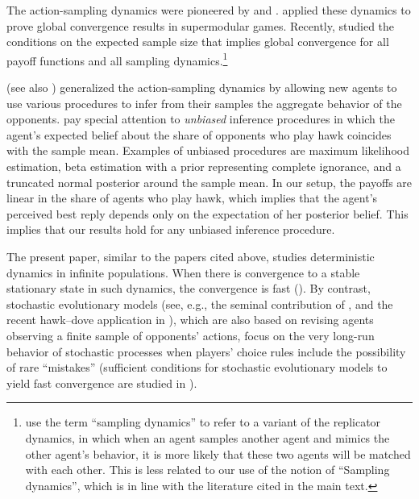 \documentclass[12pt]{article}
\numberwithin{equation}{section}
\numberwithin{figure}{section}
\theoremstyle{definition}
\theoremstyle{plain}
\theoremstyle{plain}
\theoremstyle{plain}
\theoremstyle{remark}
\theoremstyle{plain}
\theoremstyle{plain}
\begin{document}
The action-sampling dynamics were pioneered by 
  \cite{sandholm2001almost} and \cite{osborne2003sampling}. \cite{oyama2015sampling} applied these dynamics to prove global convergence results in supermodular games. Recently, \cite{heller2018social} studied the conditions on the expected sample size 
    that implies global convergence for all payoff functions and all sampling dynamics.\footnote{   \cite{hauert2018effects} use the term ``sampling dynamics'' to refer to a variant  of the replicator dynamics, in which when an agent samples another agent and mimics the other agent's behavior, it is more likely that these two agents will be matched with each other. This is less related to our use of the notion of ``Sampling dynamics'', which is in line with the literature cited in the main text.}

  
  \cite{salant2020statistical} (see also \citealp{sawa2021statistical}) generalized the action-sampling dynamics by allowing new agents to use various procedures to infer from their samples the aggregate behavior of the opponents.  \citeauthor{salant2020statistical} pay special attention to \emph{unbiased} inference procedures in which the agent's expected belief about the share of opponents who play hawk coincides with the sample mean. Examples of unbiased procedures are maximum likelihood estimation, beta estimation with a prior representing complete ignorance, and a truncated normal posterior around the sample mean. In our setup, the payoffs are linear in the share of agents who play hawk, which implies that the agent's perceived best reply depends only on the expectation of her posterior belief. This implies that our results hold for any unbiased inference procedure.
  
  The present paper, similar to the papers cited above, studies deterministic dynamics in infinite populations. When there is convergence to a stable stationary state in such dynamics, the convergence is fast
  (\citealp{oyama2015sampling}).
  By contrast, stochastic evolutionary models (see, e.g., the seminal contribution of \citealp{young1993evolution}, 
  and the recent hawk--dove application in \citealp{Bilancini-et-al-2021}), which are also based on revising agents observing a finite sample of opponents' actions,  focus on the very long-run behavior of stochastic processes when players’ choice rules include the possibility of rare “mistakes” 
  (sufficient conditions for stochastic evolutionary models to yield fast convergence are studied in \citealp{kreindler2013fast,arieli2020speed}).
 
\end{document}
